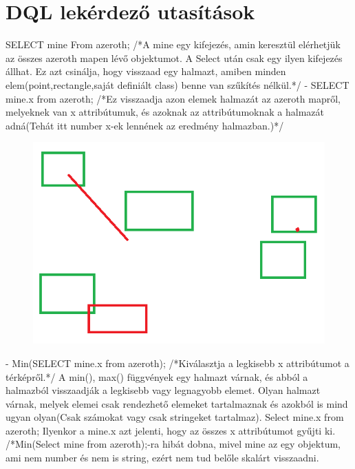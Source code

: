 \section{DQL lekérdező utasítások}

SELECT mine From azeroth;  /*A mine egy kifejezés, amin keresztül elérhetjük az összes  azeroth mapen lévő objektumot. A Select után csak egy ilyen kifejezés állhat. Ez azt csinálja, hogy visszaad egy halmazt, amiben minden elem(point,rectangle,saját definiált class) benne van szűkítés nélkül.*/
- SELECT mine.x from azeroth;  /*Ez visszaadja azon elemek halmazát az azeroth mapről, melyeknek van x attribútumuk, és azoknak az attribútumoknak a halmazát adná(Tehát itt number x-ek lennének az eredmény halmazban.)*/

\begin{figure}[htb]
\begin{center}
    \includegraphics[scale=0.5]{images/selection}
    \caption{}
    \label{fig:selection}
\end{center}
\end{figure}

- Min(SELECT mine.x from azeroth);  /*Kiválasztja a legkisebb x attribútumot a térképről.*/
A min(), max() függvények egy halmazt várnak, és abból a halmazból visszaadják a legkisebb vagy legnagyobb elemet. Olyan halmazt várnak, melyek elemei csak rendezhető elemeket tartalmaznak és azokból is mind ugyan olyan(Csak számokat vagy csak stringeket tartalmaz).
Select mine.x from azeroth;  Ilyenkor a mine.x  azt jelenti, hogy az összes x attribútumot gyűjti ki.
/*Min(Select mine from azeroth);-ra hibát dobna, mivel mine az egy objektum, ami nem number és nem is string, ezért nem tud belőle skalárt visszaadni.

